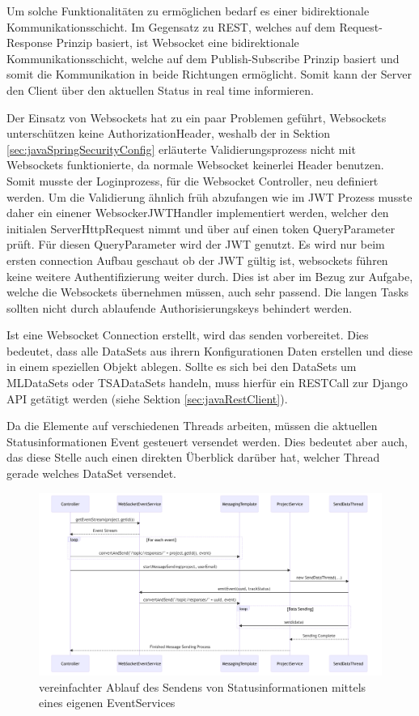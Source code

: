 Um solche Funktionalitäten zu ermöglichen bedarf es einer bidirektionale Kommunikationsschicht. 
Im Gegensatz zu REST, welches auf dem Request-Response Prinzip basiert, ist Websocket eine bidirektionale Kommunikationsschicht, welche auf dem Publish-Subscribe Prinzip basiert und somit die Kommunikation 
in beide Richtungen ermöglicht. Somit kann der Server den Client über den aktuellen Status in real time informieren.


Der Einsatz von Websockets hat zu ein paar Problemen geführt, Websockets unterschützen keine AuthorizationHeader, weshalb der in Sektion \ref{sec:javaSpringSecurityConfig} erläuterte 
Validierungsprozess nicht mit Websockets funktionierte, da normale Websocket keinerlei Header benutzen.
Somit musste der Loginprozess, für die Websocket Controller, neu definiert werden.
Um die Validierung ähnlich früh abzufangen wie im JWT Prozess musste daher ein einener WebsockerJWTHandler implementiert werden, welcher den initialen ServerHttpRequest nimmt und über auf einen token QueryParameter prüft. Für diesen QueryParameter wird der JWT genutzt.
Es wird nur beim ersten connection Aufbau geschaut ob der JWT gültig ist, websockets führen keine weitere Authentifizierung weiter durch. 
Dies ist aber im Bezug zur Aufgabe, welche die Websockets übernehmen müssen, auch sehr passend. Die langen Tasks sollten nicht durch ablaufende Authorisierungskeys behindert werden.

Ist eine Websocket Connection erstellt, wird das senden vorbereitet. Dies bedeutet, dass alle DataSets aus ihrern Konfigurationen Daten erstellen und diese in einem speziellen Objekt ablegen.
Sollte es sich bei den DataSets um MLDataSets oder TSADataSets handeln, muss hierfür ein RESTCall zur Django API getätigt werden (siehe Sektion \ref{sec:javaRestClient}).

Da die Elemente auf verschiedenen Threads arbeiten, müssen die aktuellen Statusinformationen Event gesteuert versendet werden. 
Dies bedeutet aber auch, das diese Stelle auch einen direkten Überblick darüber hat, welcher Thread gerade welches DataSet versendet.


\begin{figure}[h]
    \centering
    \includegraphics[width=1\linewidth]{includes/figures/EventService.png}
    \caption{vereinfachter Ablauf des Sendens von Statusinformationen mittels eines eigenen EventServices}
\label{fig:java_event_service}
\end{figure}

